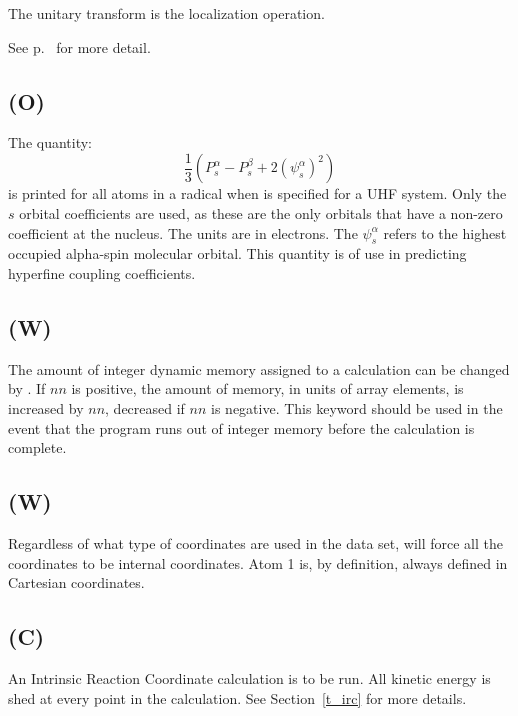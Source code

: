 The unitary transform  is the localization operation.
\begin{latexonly}
See p.~\pageref{make_hybrid} for more detail.
\end{latexonly}

\subsection*{ (O)}
The quantity:
$$
   \frac{1}{3}(P_s^{\alpha} -P_s^{\beta} +2(\psi_s^{\alpha})^2)
$$
is printed for all atoms in a radical when  is
specified for a UHF system. Only the $s$ orbital coefficients are used, as these
are the only orbitals that have a non-zero coefficient at the nucleus.  The units
are in electrons.  The $\psi_s^{\alpha}$ refers to the highest
occupied alpha-spin molecular orbital.     This quantity is of use in predicting
hyperfine coupling coefficients.

\subsection*{ (W)}
The amount of integer dynamic memory assigned to a calculation can be changed
by .  If $nn$ is positive, the amount of memory, in units of
array elements, is increased by $nn$, decreased if $nn$ is negative.  This
keyword should be used in the event that the program runs out of integer memory before
the calculation is complete.



\subsection*{ (W)}
Regardless of what type of coordinates are used in the data set, 
will force all the coordinates to be internal coordinates.  Atom 1 is,
by definition, always defined in Cartesian coordinates.



\subsection*{ (C)}
An Intrinsic Reaction Coordinate calculation  is  to  be  run.   All
kinetic   energy  is  shed  at  every  point  in  the  calculation.
See Section~\ref{t_irc} for more details.


